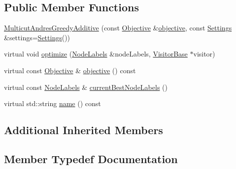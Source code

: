 \subsection*{Public Member Functions}
\begin{DoxyCompactItemize}
\item 
\hyperlink{classnifty_1_1graph_1_1MulticutAndresGreedyAdditive_a5987a422e95428b76f67b38eff44ffad}{Multicut\+Andres\+Greedy\+Additive} (const \hyperlink{classnifty_1_1graph_1_1MulticutAndres_af65f82c6d6f78356d08de6728618fc02}{Objective} \&\hyperlink{classnifty_1_1graph_1_1MulticutAndresGreedyAdditive_ae1b0d6a1cdb4472bee3576464a1562af}{objective}, const \hyperlink{structnifty_1_1graph_1_1MulticutAndresGreedyAdditive_1_1Settings}{Settings} \&settings=\hyperlink{structnifty_1_1graph_1_1MulticutAndresGreedyAdditive_1_1Settings}{Settings}())
\item 
virtual void \hyperlink{classnifty_1_1graph_1_1MulticutAndresGreedyAdditive_a96674ed03d8e5934d9bde9285475f8a3}{optimize} (\hyperlink{classnifty_1_1graph_1_1MulticutAndres_a0948881682fa859a4f2b985e0a95b2c7}{Node\+Labels} \&node\+Labels, \hyperlink{classnifty_1_1graph_1_1MulticutAndres_ac07b28fb84cb2202147dd666d5d19c25}{Visitor\+Base} $\ast$visitor)
\item 
virtual const \hyperlink{classnifty_1_1graph_1_1MulticutAndres_af65f82c6d6f78356d08de6728618fc02}{Objective} \& \hyperlink{classnifty_1_1graph_1_1MulticutAndresGreedyAdditive_ae1b0d6a1cdb4472bee3576464a1562af}{objective} () const 
\item 
virtual const \hyperlink{classnifty_1_1graph_1_1MulticutAndres_a0948881682fa859a4f2b985e0a95b2c7}{Node\+Labels} \& \hyperlink{classnifty_1_1graph_1_1MulticutAndresGreedyAdditive_a903049dae2854d7c8bc7e9a5930670df}{current\+Best\+Node\+Labels} ()
\item 
virtual std\+::string \hyperlink{classnifty_1_1graph_1_1MulticutAndresGreedyAdditive_a01ef9c86ed9c42f41a1700e97634782a}{name} () const 
\end{DoxyCompactItemize}
\subsection*{Additional Inherited Members}


\subsection{Member Typedef Documentation}
\hypertarget{classnifty_1_1graph_1_1MulticutAndresGreedyAdditive_a2f59fb0e8499bc661dad779a9acf28ba}{}
